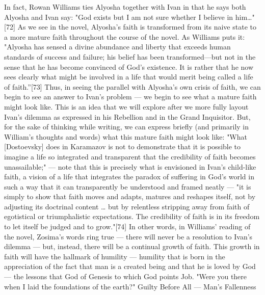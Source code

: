 In fact, Rowan Williams ties Alyosha together with Ivan in that he says both Alyosha and Ivan say: "God exists but I am not sure whether I believe in him…"[72] As we see in the novel, Alyosha's faith is transformed from its naive state to a more mature faith throughout the course of the novel. As Williams puts it: "Alyosha has sensed a divine abundance and liberty that exceeds human standards of success and failure; his belief has been transformed—but not in the sense that he has become convinced of God's existence. It is rather that he now sees clearly what might be involved in a life that would merit being called a life of faith.”[73] Thus, in seeing the parallel with Alyosha's own crisis of faith, we can begin to see an answer to Ivan's problem — we begin to see what a mature faith might look like. This is an idea that we will explore after we more fully layout Ivan's dilemma as expressed in his Rebellion and in the Grand Inquisitor. But, for the sake of thinking while writing, we can express briefly (and primarily in William's thoughts and words) what this mature faith might look like: "What [Dostoevsky] does in Karamazov is not to demonstrate that it is possible to imagine a life so integrated and transparent that the credibility of faith becomes unassailable;" — note that this is precisely what is envisioned in Ivan's child-like faith, a vision of a life that integrates the paradox of suffering in God's world in such a way that it can transparently be understood and framed neatly — "it is simply to show that faith moves and adapts, matures and reshapes itself, not by adjusting its doctrinal content … but by relentless stripping away from faith of egotistical or triumphalistic expectations. The credibility of faith is in its freedom to let itself be judged and to grow."[74] In other words, in Williams' reading of the novel, Zosima's words ring true — there will never be a resolution to Ivan's dilemma — but, instead, there will be a continual growth of faith. This growth in faith will have the hallmark of humility — humility that is born in the appreciation of the fact that man is a created being and that he is loved by God — the lessons that God of Genesis to which God points Job. "Were you there when I laid the foundations of the earth?"
Guilty Before All — Man’s Fallenness 
